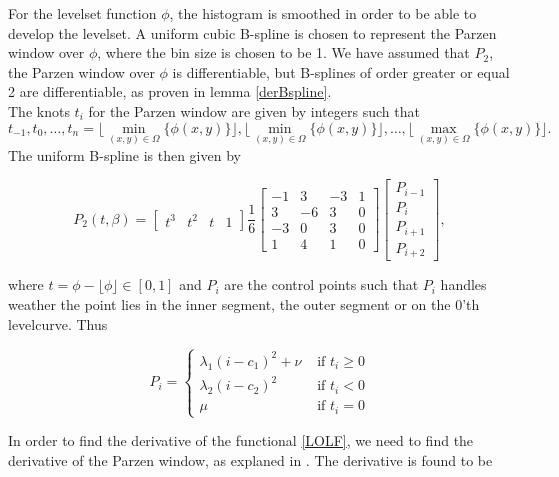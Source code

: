 For the levelset function $\phi$, the histogram is smoothed in order to be able to develop the levelset. A uniform cubic B-spline is chosen to represent the Parzen window over $\phi$, where the bin size is chosen to be 1. We have assumed that $P_2$, the Parzen window over $\phi$ is differentiable, but B-splines of order greater or equal 2 are differentiable, as proven in lemma \eqref{derBspline}.\\
The knots $t_i$ for the Parzen window are given by integers such that
\[
t_{-1},t_0,\dots,t_n = \lfloor\min_{(x,y)\in\Omega}\{\phi(x,y)\}\rfloor, \lfloor\min_{(x,y)\in\Omega}\{\phi(x,y)\}\rfloor, \dots, \lfloor\max_{(x,y)\in\Omega}\{\phi(x,y)\}\rfloor.
\]
The uniform B-spline is then given by

\begin{equation}
  P_2(t,\beta) = 
  \begin{bmatrix} t^3 & t^2 & t & 1 \end{bmatrix} 
  \frac{1}{6} 
  \begin{bmatrix}
    -1 &  3 & -3 & 1 \\
    3 & -6 &  3 & 0 \\
    -3 &  0 &  3 & 0 \\
    1 &  4 &  1 & 0 
  \end{bmatrix}
  \left[\begin{array}{l} 
      P_{i-1} \\
      P_{i} \\
      P_{i+1} \\
      P_{i+2}
    \end{array}\right],
\end{equation}

where $t = \phi-\lfloor \phi\rfloor \in [0,1]$ and $P_i$ are the control points such that $P_i$ handles weather the point lies in the inner segment, the outer segment or on the 0'th levelcurve. Thus

\begin{equation}
  P_i = 
  \begin{cases}
    \lambda_1(i-c_1)^2 + \nu & \mbox{ if } t_i \geq 0\\
    \lambda_2(i-c_2)^2 & \mbox{ if } t_i < 0\\
    \mu & \mbox{ if } t_i = 0
  \end{cases}
\end{equation}

In order to find the derivative of the functional \eqref{LOLF}, we need to find the derivative of the Parzen window, as explaned in . The derivative is found to be

